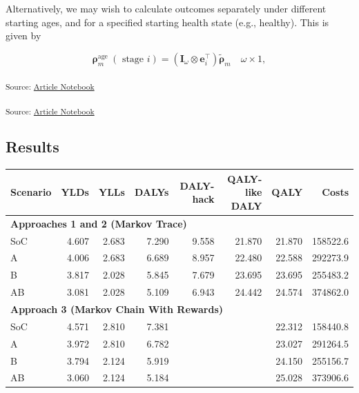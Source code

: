 \documentclass[
]{agujournal2019}
\begin{document}
Alternatively, we may wish to calculate outcomes separately under
different starting ages, and for a specified starting health state
(e.g., healthy). This is given by

\[
\boldsymbol{\rho}_{m}^{\text {age }}(\text { stage } i)=\left(\mathbf{I}_{\omega} \otimes \mathbf{e}_{i}^{\top}\right) \tilde{\boldsymbol{\rho}}_{m} \quad \omega \times 1,
\]

\textsubscript{Source:
\href{https://graveja0.github.io/dalys/index.qmd.html}{Article
Notebook}}

\textsubscript{Source:
\href{https://graveja0.github.io/dalys/index.qmd.html}{Article
Notebook}}

\subsection{Results}\label{results}

\begin{table}
\centering
\begin{tabular}{l|r|r|r|r|r|r|r}
\hline
Scenario & YLDs & YLLs & DALYs & DALY-hack & QALY-like DALY & QALY & Costs\\
\hline
\multicolumn{8}{l}{\textbf{Approaches 1 and 2 (Markov Trace)}}\\
\hline
\hspace{1em}SoC & 4.607 & 2.683 & 7.290 & 9.558 & 21.870 & 21.870 & 158522.6\\
\hline
\hspace{1em}A & 4.006 & 2.683 & 6.689 & 8.957 & 22.480 & 22.588 & 292273.9\\
\hline
\hspace{1em}B & 3.817 & 2.028 & 5.845 & 7.679 & 23.695 & 23.695 & 255483.2\\
\hline
\hspace{1em}AB & 3.081 & 2.028 & 5.109 & 6.943 & 24.442 & 24.574 & 374862.0\\
\hline
\multicolumn{8}{l}{\textbf{Approach 3 (Markov Chain With Rewards)}}\\
\hline
\hspace{1em}SoC & 4.571 & 2.810 & 7.381 &  &  & 22.312 & 158440.8\\
\hline
\hspace{1em}A & 3.972 & 2.810 & 6.782 &  &  & 23.027 & 291264.5\\
\hline
\hspace{1em}B & 3.794 & 2.124 & 5.919 &  &  & 24.150 & 255156.7\\
\hline
\hspace{1em}AB & 3.060 & 2.124 & 5.184 &  &  & 25.028 & 373906.6\\
\hline
\end{tabular}
\end{table}
\end{document}
